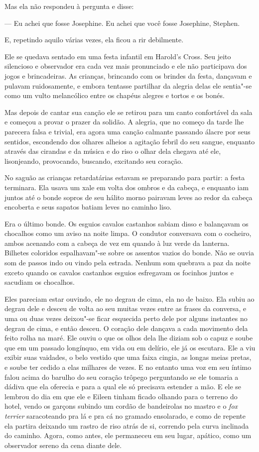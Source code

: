 Mas ela não respondeu à pergunta e disse:

 --- Eu achei que fosse Josephine. Eu achei que você fosse Josephine,
Stephen.

E, repetindo aquilo várias vezes, ela ficou a rir debilmente.

Ele se quedava sentado em uma festa infantil em
Harold’s Cross. Seu jeito silencioso e observador era
cada vez mais pronunciado e ele não participava dos jogos e
brincadeiras. As crianças, brincando com os brindes da festa,
dançavam e pulavam ruidosamente, e embora tentasse partilhar da alegria
delas ele sentia"-se como um vulto melancólico entre os chapéus alegres
e tortos e os bonés.

Mas depois de cantar sua canção ele se retirou para um canto confortável
da sala e começou a provar o prazer da solidão. A alegria, que no
começo da tarde lhe parecera falsa e trivial, era agora uma canção
calmante passando álacre por seus sentidos, escondendo dos olhares
alheios a agitação febril do seu sangue, enquanto através das cirandas e
da música e do riso o olhar dela chegava até ele, lisonjeando,
provocando, buscando, excitando seu coração.

No saguão as crianças retardatárias estavam se preparando para partir: a
festa terminara. Ela usava um xale em volta dos ombros e da cabeça, e
enquanto iam juntos até o bonde sopros de seu hálito morno pairavam
leves ao redor da cabeça encoberta e seus sapatos batiam
leves no caminho liso.

Era o último bonde. Os esguios cavalos castanhos sabiam disso e
balançavam os chocalhos como um aviso na noite limpa. O condutor
conversava com o cocheiro, ambos acenando com a cabeça de vez em quando
à luz verde da lanterna. Bilhetes coloridos espalhavam"-se sobre os
assentos vazios do bonde. Não se ouvia som de passos indo ou vindo pela
estrada. Nenhum som quebrava a paz da noite exceto quando os cavalos
castanhos esguios esfregavam os focinhos juntos e sacudiam os
chocalhos.

Eles pareciam estar ouvindo, ele no degrau de cima, ela no de baixo. Ela
subiu ao degrau dele e desceu de volta ao seu muitas vezes entre as
frases da conversa, e uma ou duas vezes deixou"-se ficar esquecida perto
dele por alguns instantes no degrau de cima, e então desceu. O coração
dele dançava a cada movimento dela feito rolha na maré. Ele ouviu o que
os olhos dela lhe diziam sob o capuz e soube que em um passado
longínquo, em vida ou em delírio, ele já os escutara. Ele a viu exibir suas vaidades, 
o belo vestido que uma faixa cingia, as
longas meias pretas, e soube ter cedido a elas milhares de vezes. E no
entanto uma voz em seu íntimo falou acima do barulho do seu coração
trôpego perguntando se ele tomaria a dádiva que ela oferecia e
para a qual ele só precisava estender a mão. E ele se lembrou do dia em
que ele e Eileen tinham ficado olhando para o terreno do hotel, vendo
os garçons subindo um cordão de bandeirolas no mastro e o \textit{fox
terrier} saracoteando pra lá e pra cá no gramado ensolarado, e como de
repente ela partira deixando um rastro de riso atrás de si, correndo
pela curva inclinada do caminho. Agora, como antes, ele permaneceu em
seu lugar, apático, como um observador sereno da cena diante dele.

